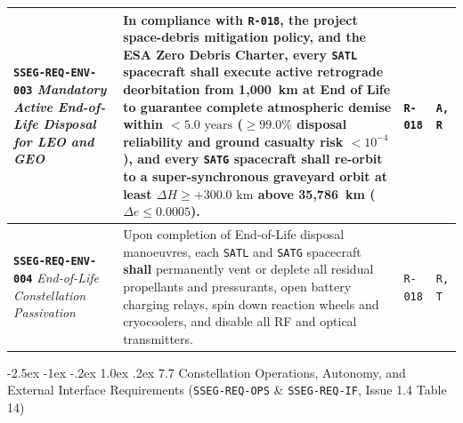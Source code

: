 \documentclass[11pt,a4paper]{article}
\makeatletter
\renewcommand\subsection{\@startsection{subsection}{2}{\z@}%
    {-2.5ex \@plus -1ex \@minus -.2ex}%
    {1.0ex \@plus .2ex}%
    {\normalfont\large\bfseries\sffamily\color{SubHeadingBlue}}}
\providecommand{\abbr}[1]{#1}
\makeatother
\begin{document}
{\begin{longtable}{|>{\raggedright\arraybackslash}p{}|>{\raggedright\arraybackslash}p{}|>{\raggedright\arraybackslash}p{}|>{\raggedright\arraybackslash}p{}|}
\textbf{\texttt{SSEG-REQ-ENV-003}} \newline \emph{Mandatory Active End-of-Life Disposal for LEO and GEO} & In compliance with \texttt{R-018}, the project space-debris mitigation policy, and the \textbf{ESA Zero Debris Charter}, every \texttt{SATL} spacecraft \textbf{shall} execute active retrograde deorbitation from 1,000~km at End of Life to guarantee complete atmospheric demise within $< 5.0\text{ years}$ ($\ge 99.0\%$ disposal reliability and ground casualty risk $< 10^{-4}$), and every \texttt{SATG} spacecraft \textbf{shall} re-orbit to a super-synchronous graveyard orbit at least $\Delta H \ge +300.0\text{ km}$ above 35,786~km ($\Delta e \le 0.0005$). & \texttt{R-018} & \texttt{A, R} \\ \hline
\textbf{\texttt{SSEG-REQ-ENV-004}} \newline \emph{End-of-Life Constellation Passivation} & Upon completion of End-of-Life disposal manoeuvres, each \texttt{SATL} and \texttt{SATG} spacecraft \textbf{shall} permanently vent or deplete all residual propellants and pressurants, open battery charging relays, spin down reaction wheels and cryocoolers, and disable all \abbr{RF} and optical transmitters. & \texttt{R-018} & \texttt{R, T} \\ \hline
\end{longtable}}

\subsection{7.7 Constellation Operations, Autonomy, and External Interface Requirements (\texttt{SSEG-REQ-OPS} \& \texttt{SSEG-REQ-IF}, Issue 1.4 Table 14)}
\end{document}
